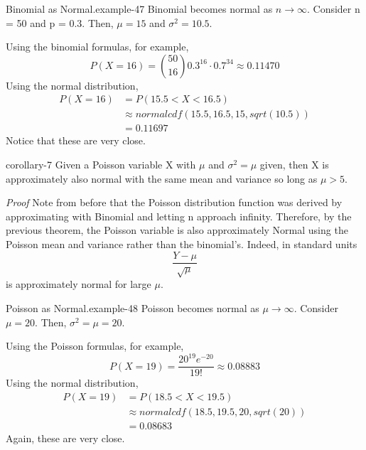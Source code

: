 \documentclass[10pt,]{book}
\makeatletter
\renewcommand*{\proofname}{Proof}
\renewenvironment{proof}[1][\proofname]{\par
  \pushQED{\qed}%
  \normalfont \topsep6\p@\@plus6\p@\relax
  \trivlist
  \item\relax
    {\itshape
    #1\@addpunct{.}}\hspace\labelsep\ignorespaces
}{%
  \popQED\endtrivlist\@endpefalse
}
\numberwithin{equation}{section}
\newcommand{\lt}{<}
\newcommand{\gt}{>}
\makeatother
\begin{document}
\begin{example}{Binomial as Normal.}{example-47}%
\hypertarget{p-1298}{}%
Binomial becomes normal as \(n \rightarrow \infty\).  Consider n = 50 and p = 0.3.  Then, \(\mu = 15\) and \(\sigma^2 = 10.5\).%
\par
\hypertarget{p-1299}{}%
Using the binomial formulas, for example,%
\begin{equation*}
P( X = 16 ) = \binom{50}{16} 0.3^{16} \cdot 0.7^{34} \approx 0.11470
\end{equation*}
Using the normal distribution,%
\begin{align*}
P( X = 16 ) & = P( 15.5 \lt X \lt 16.5) \\
& \approx normalcdf(15.5,16.5,15,sqrt(10.5)) \\
& = 0.11697
\end{align*}
Notice that these are very close.%
\end{example}
\begin{corollary}{}{}{corollary-7}%
\hypertarget{p-1300}{}%
Given a Poisson variable X with \(\mu\) and \(\sigma^2 = \mu\) given, then X is approximately also normal with the same mean and variance so long as \(\mu \gt 5\).%
\end{corollary}
\begin{proof}\hypertarget{proof-70}{}
\hypertarget{p-1301}{}%
Note from before that the Poisson distribution function was derived by approximating with Binomial and letting n approach infinity. Therefore, by the previous theorem, the Poisson variable is also approximately Normal using the Poisson mean and variance rather than the binomial's. Indeed, in standard units%
\begin{equation*}
\frac{Y - \mu}{\sqrt{\mu}}
\end{equation*}
is approximately normal for large \(\mu\).%
\end{proof}
\begin{example}{Poisson as Normal.}{example-48}%
\hypertarget{p-1302}{}%
Poisson becomes normal as \(\mu \rightarrow \infty\).  Consider \(\mu = 20\).  Then, \(\sigma^2 = \mu = 20\).%
\par
\hypertarget{p-1303}{}%
Using the Poisson formulas, for example,%
\begin{equation*}
P( X = 19 ) = \frac{20^{19} e^{-20}}{19!} \approx 0.08883
\end{equation*}
Using the normal distribution,%
\begin{align*}
P( X = 19 ) & = P( 18.5 \lt X \lt 19.5) \\
& \approx normalcdf(18.5,19.5,20,sqrt(20)) \\
& = 0.08683
\end{align*}
Again, these are very close.%
\end{example}
\end{document}
